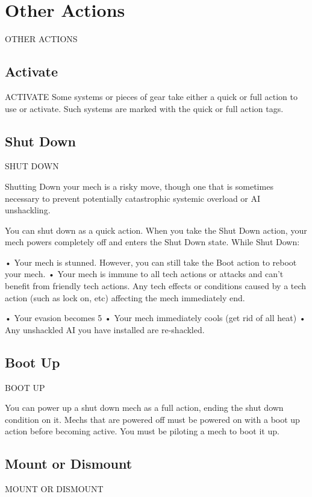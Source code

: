 \section{Other Actions} OTHER ACTIONS  
\subsection{Activate}
                                             ACTIVATE  
Some systems or pieces of gear take either a quick or full action to use or activate. Such  
systems are marked with the quick or full action tags.
 
\subsection{Shut Down}
                                           SHUT DOWN  

Shutting Down your mech is a risky move, though one that is sometimes necessary to prevent  
potentially catastrophic systemic overload or AI unshackling.   

You can shut down as a quick action. When you take the Shut Down action, your mech powers  
completely off and enters the Shut Down state. While Shut Down:
 
       •  Your mech is stunned. However, you can still take the Boot action to reboot your mech.  
       •  Your mech is immune to all tech actions or attacks and can’t benefit from friendly tech  
         actions. Any tech effects or conditions caused by a tech action (such as lock on, etc)  
         affecting the mech immediately end.
 
       •  Your evasion becomes 5  
       •  Your mech immediately cools (get rid of all heat)  
       • Any unshackled AI you have installed are re-shackled.  
\subsection{Boot Up}
                                              BOOT UP
 
You can power up a shut down mech as a full action, ending the shut down condition on it.  
Mechs that are powered off must be powered on with a boot up action before becoming active.  
You must be piloting a mech to boot it up.
 

                                                                                                         

\subsection{Mount or Dismount}
                                     MOUNT OR DISMOUNT   

